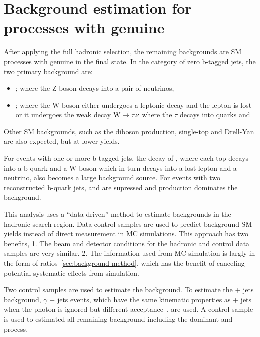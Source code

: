 \clearpage
\section{Background estimation for processes with genuine \texorpdfstring{\met}{MET}\label{sec:backgrounds}}

After applying the full hadronic selection, the remaining 
backgrounds are SM processes with genuine \met in the final state. 
In the category of zero b-tagged jets, the two primary background are:
\begin{itemize}
\item \zj; where the Z boson decays into a pair of neutrinos, 
\item \wj; where the W boson either undergoes a leptonic decay 
and the lepton is lost or it undergoes the weak decay ${\text W} \rightarrow \tau\nu$ where the $\tau$ decays into quarks and 
\end{itemize}
%
Other SM backgrounds, such as the diboson production, single-top and 
Drell-Yan are also expected, but at lower yields.

For events with one or more b-tagged jets, the decay of \ttbar, where each
top decays into a b-quark and a W boson which in turn decays into 
a lost lepton and a neutrino, also becomes a large background source.
For events with two reconstructed b-quark jets, \wj and \zj are supressed
and \ttbar production dominates the background. 

This analysis uses a ``data-driven'' method to estimate backgrounds
in the hadronic search region. Data control samples are used to predict
background SM yields instead of direct measurement in MC simulations. 
This approach has two benefits, 1. The beam and detector conditions 
for the hadronic and control data samples are very similar. 2. The information 
used from MC simulation is largly in the form of ratios~\ref{sec:background-method}, 
which has the benefit of canceling potential systematic effects from simulation.

Two control samples are used to estimate the background. To estimate the
\znunu + jets background, $\gamma$ + jets events, which have the same
kinematic properties as \znunu + jets when the photon is ignored but 
different acceptance~\cite{PAS-SUS-08-002,Bern:2011pa}, are used. A \mj control
sample is used to estimated all remaining background including the 
dominant \wj and \ttbar process.

